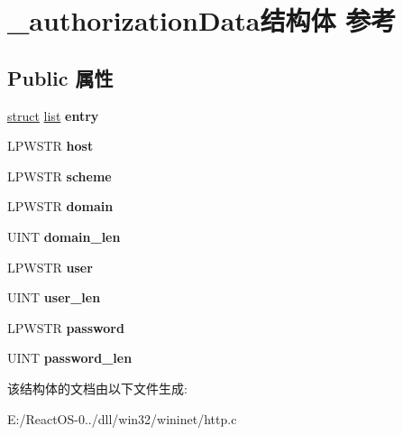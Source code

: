 \hypertarget{struct__authorization_data}{}\section{\+\_\+authorization\+Data结构体 参考}
\label{struct__authorization_data}
\subsection*{Public 属性}
\begin{DoxyCompactItemize}
\item 
\mbox{\label{struct__authorization_data_a1863ed8b952da74f68dea05d553bc6e5}} 
\hyperlink{interfacestruct}{struct} \hyperlink{classlist}{list} {\bfseries entry}
\item 
\mbox{\label{struct__authorization_data_a9b6b0ba4d856a19004460e69fc4f9f80}} 
L\+P\+W\+S\+TR {\bfseries host}
\item 
\mbox{\label{struct__authorization_data_aa70e4ead1d9e1a7a902a22c86a2183c0}} 
L\+P\+W\+S\+TR {\bfseries scheme}
\item 
\mbox{\label{struct__authorization_data_a6ddfc7f2a91d1b12bcb22b8d48091971}} 
L\+P\+W\+S\+TR {\bfseries domain}
\item 
\mbox{\label{struct__authorization_data_a1f3383e8e0d34158ad3eba1d17d34cdb}} 
U\+I\+NT {\bfseries domain\+\_\+len}
\item 
\mbox{\label{struct__authorization_data_ad42881acde5c5c051e195ac6d7f5d868}} 
L\+P\+W\+S\+TR {\bfseries user}
\item 
\mbox{\label{struct__authorization_data_a8f36d31dda931bf28459796bc926288e}} 
U\+I\+NT {\bfseries user\+\_\+len}
\item 
\mbox{\label{struct__authorization_data_a5647d29b48647d9b5f432dfce82b1715}} 
L\+P\+W\+S\+TR {\bfseries password}
\item 
\mbox{\label{struct__authorization_data_ae6a3ce7b6fff23435f6de3cb2d13b22c}} 
U\+I\+NT {\bfseries password\+\_\+len}
\end{DoxyCompactItemize}


该结构体的文档由以下文件生成\+:\begin{DoxyCompactItemize}
\item 
E\+:/\+React\+O\+S-\/0../dll/win32/wininet/http.\+c\end{DoxyCompactItemize}
